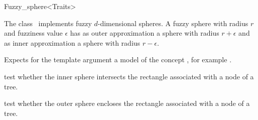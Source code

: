 

\begin{ccRefClass}{Fuzzy_sphere<Traits>}  %


\ccDefinition
  
The class \ccRefName\ implements fuzzy $d$-dimensional spheres.
A fuzzy sphere with radius $r$ and fuzziness value $\epsilon$ has
as outer approximation a sphere with radius $r+\epsilon$ and
as inner approximation a sphere with radius $r-\epsilon$. 


\ccParameters


Expects for the template argument a model of the concept
, for example .

\ccIsModel


\ccTypes
{}

\ccCreation
{}  %




\ccOperations


{test whether the inner sphere intersects the rectangle
associated with a node of a tree.}

{test whether the outer sphere encloses the rectangle associated with a node of a tree.}

\ccSeeAlso


\end{ccRefClass}


